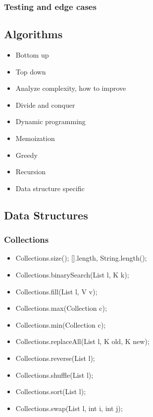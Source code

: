 \documentclass[10pt]{article}
\begin{document}
\subsubsection{Testing and edge cases}

\subsection{Algorithms}
\begin{itemize}
    \item Bottom up
    \item Top down
    \item Analyze complexity, how to improve
    \item Divide and conquer
    \item Dynamic programming
    \item Memoization
    \item Greedy
    \item Recursion
    \item Data structure specific
\end{itemize}

\subsection{Data Structures}
\subsubsection{Collections}
\begin{itemize}
    \item Collections.size(); [].length, String.length();
    \item Collections.binarySearch(List l, K k);
    \item Collections.fill(List l, V v);
    \item Collections.max(Collection c);
    \item Collections.min(Collection c);
    \item Collections.replaceAll(List l, K old, K new);
    \item Collections.reverse(List l);
    \item Collections.shuffle(List l);
    \item Collections.sort(List l);
    \item Collections.swap(List l, int i, int j);
\end{itemize}
\end{document}
